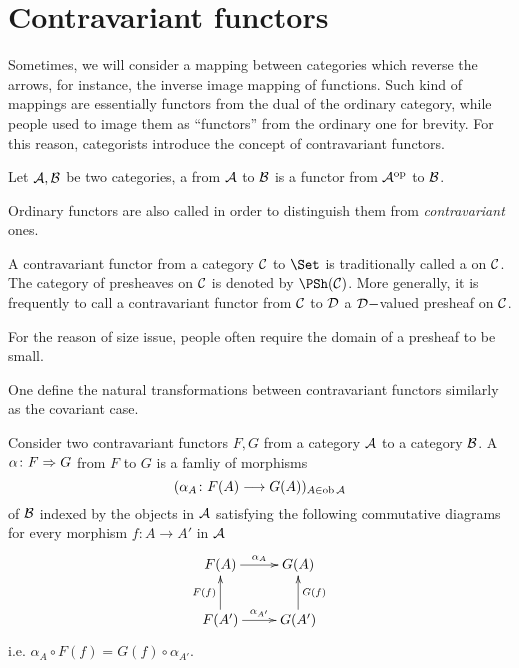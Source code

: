 \newpage\section{Contravariant functors}
  Sometimes, we will consider a mapping between categories which reverse the arrows, for instance, the inverse image mapping of functions. Such kind of mappings are essentially functors from the dual of the ordinary category, while people used to image them as ``functors'' from the ordinary one for brevity.
  For this reason, categorists introduce the concept of contravariant functors.
  \begin{defn}
    Let ${\cal A}, {\cal B}$ be two categories, a  from ${\cal A}$ to ${\cal B}$ is a functor from ${\cal A}^{\operatorname{op}}$ to ${\cal B}$.
  \end{defn}
  Ordinary functors are also called  in order to distinguish them from \emph{contravariant} ones.
  \begin{exam}
    A contravariant functor from a category ${\cal C}$ to $\Set$ is traditionally called a  on ${\cal C}$. The category of presheaves on ${\cal C}$ is denoted by $\PSh(\Cc)$. More generally, it is frequently to call a contravariant functor from ${\cal C}$ to ${\cal D}$ a ${\cal D}-$valued presheaf on ${\cal C}$.
  \end{exam}
  \begin{rem}
    For the reason of size issue, people often require the domain of a presheaf to be small.
  \end{rem}
  One define the natural transformations between contravariant functors similarly as the covariant case.
  \begin{defn}
    Consider two contravariant functors $F,G$ from a category ${\cal A}$ to a category ${\cal B}$. A  $\alpha\colon F\Rightarrow G$ from $F$ to $G$ is a famliy of morphisms
    \begin{equation*}
    (\alpha_A\colon F(A)\longrightarrow G(A))_{A\in\operatorname{ob}{\cal A}}
    \end{equation*}
    of ${\cal B}$ indexed by the objects in ${\cal A}$ satisfying the following commutative diagrams for every morphism $f\colon A \to A'$ in ${\cal A}$
    \begin{displaymath}
      \xymatrix{
         F(A)\ar[r]^{\alpha_A}&G(A)\\
         F(A')\ar[r]^{\alpha_{A'}}\ar[u]^{F(f)}&G(A')\ar[u]_{G(f)}
      }
    \end{displaymath}
    i.e. $\alpha_{A}\circ F(f) = G(f) \circ \alpha_{A'}$.
  \end{defn}


